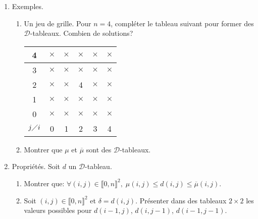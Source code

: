 \begin{enumerate}
  \item Exemples.
\begin{enumerate}
  \item Un jeu de grille. Pour $n=4$, compléter le tableau suivant pour former des $\mathcal{D}$-tableaux. Combien de solutions?
\begin{center}
\renewcommand {\arraystretch} {1.2}
\begin{tabular}{c|c|c|c|c|c|}
4            & $×$ & $×$ & $×$ & $×$ & $×$ \\ \hline
3            & $×$ & $×$ & $×$ & $×$ & $×$ \\ \hline
2            & $×$ & $×$ & 4   & $×$ & $×$ \\ \hline
1            & $×$ & $×$ & $×$ & $×$ & $×$ \\ \hline
0            & $×$ & $×$ & $×$ & $×$ & $×$ \\ \hline
$j\diagup i$ & 0   & 1   & 2   & 3   & 4
\end{tabular}
\end{center}

  \item Montrer que $\mu$ et $\overline{\mu}$ sont des $\mathcal{D}$-tableaux.
\end{enumerate}

\item Propriétés. Soit $d$ un $\mathcal{D}$-tableau.
\begin{enumerate}
  \item Montrer que: $\forall (i,j)\in  \llbracket 0,n \rrbracket^2,\; \mu(i,j) \leq d(i,j) \leq \overline{\mu}(i,j)$.
  \item Soit $(i,j)\in  \llbracket 0,n \rrbracket^2$ et $\delta = d(i,j)$. Présenter dans des tableaux $2\times 2$ les valeurs possibles pour $d(i-1,j)$, $d(i,j-1)$, $d(i-1,j-1)$.
\end{enumerate}


\end{enumerate}
